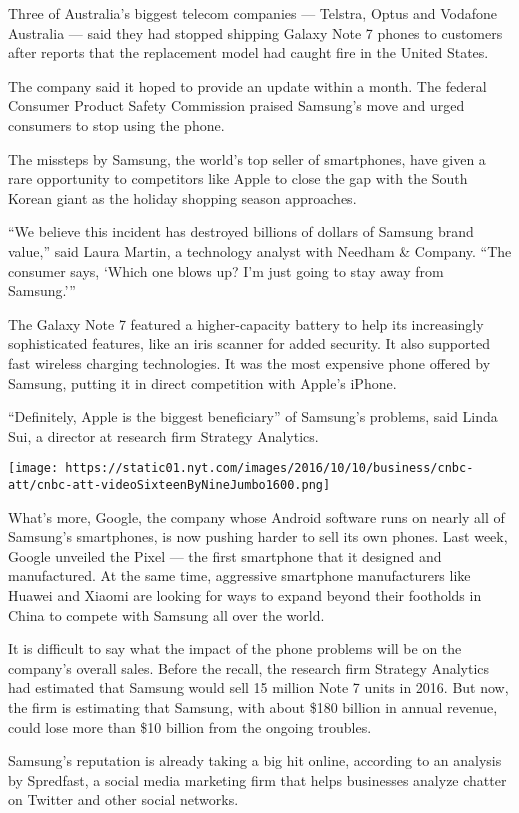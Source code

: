 Three of Australia's biggest telecom companies --- Telstra, Optus and
Vodafone Australia --- said they had stopped shipping Galaxy Note 7
phones to customers after reports that the replacement model had caught
fire in the United States.

The company said it hoped to provide an update within a month. The
federal Consumer Product Safety Commission praised Samsung's move and
urged consumers to stop using the phone.

The missteps by Samsung, the world's top seller of smartphones, have
given a rare opportunity to competitors like Apple to close the gap with
the South Korean giant as the holiday shopping season approaches.

``We believe this incident has destroyed billions of dollars of Samsung
brand value,'' said Laura Martin, a technology analyst with Needham \&
Company. ``The consumer says, `Which one blows up? I'm just going to
stay away from Samsung.'''

The Galaxy Note 7 featured a higher-capacity battery to help its
increasingly sophisticated features, like an iris scanner for added
security. It also supported fast wireless charging technologies. It was
the most expensive phone offered by Samsung, putting it in direct
competition with Apple's iPhone.

``Definitely, Apple is the biggest beneficiary'' of Samsung's problems,
said Linda Sui, a director at research firm Strategy Analytics.

\texttt{[image: https://static01.nyt.com/images/2016/10/10/business/cnbc-att/cnbc-att-videoSixteenByNineJumbo1600.png]}

What's more, Google, the company whose Android software runs on nearly
all of Samsung's smartphones, is now pushing harder to sell its own
phones. Last week, Google unveiled the Pixel --- the first smartphone
that it designed and manufactured. At the same time, aggressive
smartphone manufacturers like Huawei and Xiaomi are looking for ways to
expand beyond their footholds in China to compete with Samsung all over
the world.

It is difficult to say what the impact of the phone problems will be on
the company's overall sales. Before the recall, the research firm
Strategy Analytics had estimated that Samsung would sell 15 million Note
7 units in 2016. But now, the firm is estimating that Samsung, with
about \$180 billion in annual revenue, could lose more than \$10 billion
from the ongoing troubles.

Samsung's reputation is already taking a big hit online, according to an
analysis by Spredfast, a social media marketing firm that helps
businesses analyze chatter on Twitter and other social networks.

